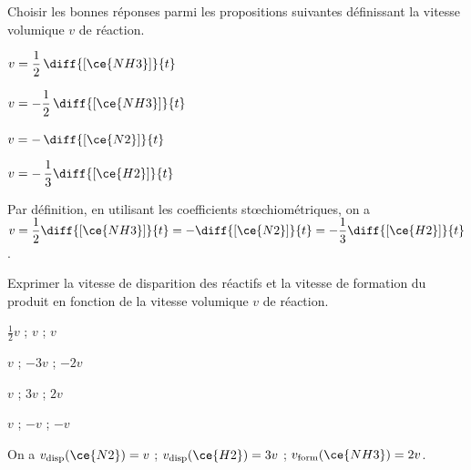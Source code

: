 

\begin{enonce}
Choisir les bonnes réponses parmi les propositions suivantes définissant la vitesse volumique $v$ de réaction.
	\begin{listeQCM2Colonnes}
	\item $v=\dfrac{1}{2} \, \diff{[\ce{NH3}]}{t}$ \smallskip
	\item $v=-\dfrac{1}{2}\,  \diff{[\ce{NH3}]}{t}$ \smallskip
	\item $v= - \, \diff{[\ce{N2}]}{t}$ \smallskip
	\item $v=- \,  \dfrac{1}{3} \diff{[\ce{H2}]}{t}$
	\end{listeQCM2Colonnes}
\end{enonce}

\reponse{\reponseA{}\reponseC{}\reponseD{}}

\begin{corrige}
Par définition, en utilisant les coefficients stœchiométriques, on a $v = \dfrac{1}{2} \diff{[\ce{NH3}]}{t} =  - \diff{[\ce{N2}]}{t} =  - \dfrac{1}{3} \diff{[\ce{H2}]}{t}$.
\end{corrige}




\begin{enonce}
Exprimer la vitesse de disparition des réactifs et la vitesse de formation du produit en fonction de la vitesse volumique $v$ de réaction.
\begin{listeQCM2Colonnes}
	\item $\frac{1}{2}v$ ; $v$ ; $v$
	\item $v$ ; $-3v$ ; $-2v$  
	\item $v$ ; $3v$ ; $2v$  
	\item $v$ ; $-v$ ; $-v$
	\end{listeQCM2Colonnes}
\end{enonce}

\reponse{\reponseC{}}

\begin{corrige}
On a $v_\text{disp}(\ce{N2}) = v$ ; $v_\text{disp}(\ce{H2}) = 3 v$ ; $v_\text{form}(\ce{NH3}) = 2 v $.
\end{corrige}

